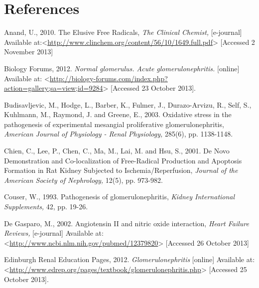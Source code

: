 \documentclass[12pt]{report}
\begin{document}
\newpage

\section*{References}

Anand, U., 2010. The Elusive Free Radicals, \textit{The Clinical Chemist,} [e-journal] Available at:<\url{http://www.clinchem.org/content/56/10/1649.full.pdf}> [Accessed 2 November 2013]
\newline
\newline

Biology Forums, 2012. \textit{Normal glomerulus. Acute glomerulonephritis.} [online] Available at: <\url{http://biology-forums.com/index.php?action=gallery;sa=view;id=9284}> [Accessed 23 October 2013].
\newline
\newline

Budisavljevic, M., Hodge, L., Barber, K., Fulmer, J., Durazo-Arvizu, R., Self, S., Kuhlmann, M., Raymond, J. and Greene, E., 2003. Oxidative stress in the pathogenesis of experimental mesangial proliferative glomerulonephritis, \textit{American Journal of Physiology - Renal Physiology,} 285(6), pp. 1138-1148.
\newline
\newline

Chien, C., Lee, P., Chen, C., Ma, M., Lai, M. and Hsu, S., 2001. De Novo Demonstration and Co-localization of Free-Radical Production and Apoptosis Formation in Rat Kidney Subjected to Ischemia/Reperfusion, \textit{Journal of the American Society of Nephrology,} 12(5), pp. 973-982.
\newline
\newline

Couser, W., 1993. Pathogenesis of glomerulonephritis, \textit{Kidney International Supplements,} 42, pp. 19-26.
\newline
\newline

De Gasparo, M., 2002. Angiotensin II and nitric oxide interaction, \textit{Heart Failure Reviews,} [e-journal] Available at:<\url{http://www.ncbi.nlm.nih.gov/pubmed/12379820}> [Accessed 26 October 2013]
\newline
\newline

Edinburgh Renal Education Pages, 2012. \textit{Glomerulonephritis} [online] Available at: <\url{http://www.edrep.org/pages/textbook/glomerulonephritis.php}> [Accessed 25 October 2013].
\newline
\newline
\end{document}
